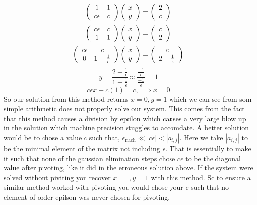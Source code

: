 \documentclass{article}
\begin{document}
\begin{enumerate}
\[
\left(\begin{array}{c c}
1 & 1 \\
c\epsilon & c 
\end{array}\right) \left(\begin{array}{c}
x \\
y
\end{array}\right) = \left(\begin{array}{c}
2 \\ 
c
\end{array}\right) 
\]
\[
\left(\begin{array}{c c}
c\epsilon & c \\
1 & 1
\end{array}\right) \left(\begin{array}{c}
x \\
y
\end{array}\right) = \left(\begin{array}{c}
c \\ 
2
\end{array}\right) 
\]
\[
\left(\begin{array}{c c}
c\epsilon & c \\
0 & 1 - \frac{1}{\epsilon}
\end{array}\right) \left(\begin{array}{c}
x \\
y
\end{array}\right) = \left(\begin{array}{c}
c \\ 
2 - \frac{1}{\epsilon}
\end{array}\right) 
\]
\[
    y = \frac{2 - \frac{1}{\epsilon}}{1 - \frac{1}{\epsilon}} \approx \frac{\frac{-1}{\epsilon}}{\frac{-1}{\epsilon}} = 1
\]
\[
    c\epsilon x + c(1)  = c, \implies x = 0
\]
So our solution from this method returns $x = 0, y = 1$ which we can see from som simple arithmetic does not properly solve our system. This comes from the fact that this method causes a division by epsilon which causes a very large blow up in the solution which machine precision stuggles to accomdate. A better solution would be to chose a value c such that, $\epsilon_{\text{mach}} \ll |c\epsilon| < |a_{i,j}|$. Here we take $|a_{i, j}|$ to be the minimal element of the matrix not including $\epsilon$. That is essentially to make it such that none of the gaussian elimination steps chose $c\epsilon$ to be the diagonal value after pivoting, like it did in the erroneous solution above. If the system were solved without piviting you recover $x = 1, y = 1$ with this method. So to ensure a similar method worked with pivoting you would chose your c such that no element of order epilson was never chosen for pivoting.


\end{enumerate}
\end{document}
